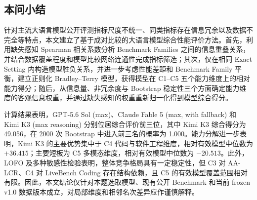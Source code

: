 \subsection{本问小结}

针对主流大语言模型公开评测指标尺度不统一、同类指标存在信息冗余以及数据不完全等特点，本文建立了基于成对比较的大语言模型综合性能评价方法。首先，利用缺失感知 Spearman 相关系数分析 Benchmark Families 之间的信息重叠关系，并结合数据覆盖程度和模型比较网络连通性完成指标筛选；其次，仅在相同 Exact Setting 内构造模型胜负关系，并进一步考虑性能差距和 Benchmark Family 平衡，建立正则化 Bradley--Terry 模型，获得模型在 C1--C5 五个能力维度上的相对能力得分；随后，从信息量、非冗余度与 Bootstrap 稳定性三个方面确定能力维度的客观信息权重，并通过缺失感知的权重重新归一化得到模型综合得分。

计算结果表明，GPT-5.6 Sol (max)、Claude Fable 5 (max, with fallback) 和 Kimi K3 (max reasoning) 分别位居综合评价前三位，其中 Kimi K3 综合得分为 49.056，在 2000 次 Bootstrap 中进入前三名的概率为 1.000。能力分解进一步表明，Kimi K3 的主要优势集中于 C4 代码与软件工程维度，相对有效模型中位数为 \(+36.415\)；主要短板为 C5 多模态维度，相对有效模型中位数为 \(-20.513\)。此外，LOFO 及多种敏感性检验表明，整体竞争格局具有一定稳定性，但 C3 对 AA-LCR、C4 对 LiveBench Coding 存在结构依赖，且 C5 的有效模型覆盖范围相对有限。因此，本文结论仅针对本题选取模型、现有公开 Benchmark 和当前 frozen v1.0 数据版本成立，对局部维度和相邻名次差异应作谨慎解释。
